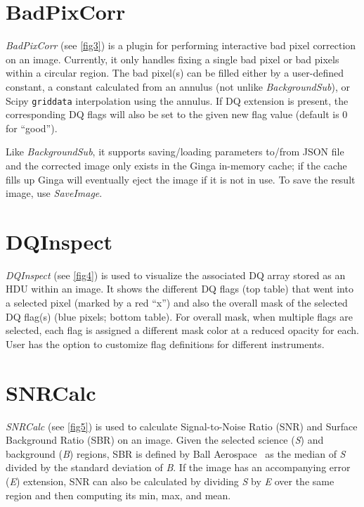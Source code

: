 \documentclass[11pt,twoside]{article}
\begin{document}
\section{BadPixCorr}

{\em BadPixCorr} (see \ref{fig3}) is a plugin for performing interactive bad pixel
correction on an image. Currently, it only handles fixing a single bad pixel or
bad pixels within a circular region.
The bad pixel(s) can be filled either by a user-defined constant, a constant
calculated from an annulus (not unlike {\em BackgroundSub}), or Scipy
{\tt griddata} interpolation using the annulus.
If DQ extension is present, the corresponding DQ flags will also be set
to the given new flag value (default is 0 for ``good'').


Like {\em BackgroundSub}, it supports saving/loading parameters to/from
JSON file and the corrected image only exists in the Ginga in-memory cache;
if the cache fills up Ginga will eventually eject the image if it is not
in use.  To save the result image, use {\em SaveImage}.

\section{DQInspect}

{\em DQInspect} (see \ref{fig4}) is used to visualize the associated DQ
array stored as an HDU within an image.
It shows the different DQ flags (top table) that went into a selected pixel
(marked by a red ``x'')
and also the overall mask of the selected DQ flag(s)
(blue pixels; bottom table).
For overall mask, when multiple flags are selected, each flag is assigned a
different mask color at a reduced opacity for each.
User has the option to customize flag definitions for different instruments.


\section{SNRCalc}

{\em SNRCalc} (see \ref{fig5}) is used to calculate Signal-to-Noise Ratio
(SNR) and Surface Background Ratio (SBR) on an image.
Given the selected science ({\em S}) and background ({\em B}) regions,
SBR is defined by Ball Aerospace~\citep{sbr} as the median of {\em S}
divided by the standard deviation of {\em B}.
If the image has an accompanying error ({\em E}) extension, SNR can also
be calculated by dividing {\em S} by {\em E} over the same region and
then computing its min, max, and mean.
\end{document}
